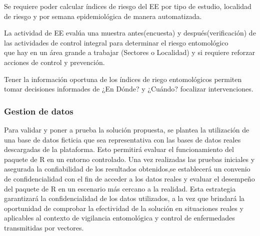 \documentclass[
  letterpaper,
  DIV=11,
  numbers=noendperiod]{scrartcl}
\begin{document}
Se requiere poder calcular índices de riesgo del EE por tipo de estudio,
localidad de riesgo y por semana epidemiológica de manera automatizada.

La actividad de EE evalúa una muestra antes(encuesta) y
después(verificación) de las actividades de control integral para
determinar el riesgo entomológico\\
que hay en un área grande a trabajar (Sectores o Localidad) y si
requiere reforzar acciones de control y prevención.

Tener la información oportuna de los índices de riego entomológicos
permiten tomar decisiones informades de ¿En Dónde? y ¿Cuándo? focalizar
intervenciones.

\subsubsection{Gestion de datos}\label{gestion-de-datos}

Para validar y poner a prueba la solución propuesta, se plantea la
utilización de una base de datos ficticia que sea representativa con las
bases de datos reales descargadas de la plataforma. Esto permitirá
evaluar el funcionamiento del paquete de R en un entorno controlado. Una
vez realizadas las pruebas iniciales y asegurada la confiabilidad de los
resultados obtenidos,se establecerá un convenio de confidencialidad con
el fin de acceder a los datos reales y evaluar el desempeño del paquete
de R en un escenario más cercano a la realidad. Esta estrategia
garantizará la confidencialidad de los datos utilizados, a la vez que
brindará la oportunidad de comprobar la efectividad de la solución en
situaciones reales y aplicables al contexto de vigilancia entomológica y
control de enfermedades transmitidas por vectores.
\end{document}
